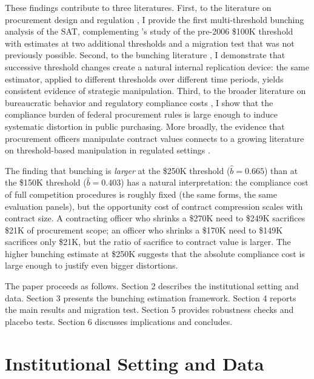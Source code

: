 \documentclass[12pt]{article}
\begin{document}
These findings contribute to three literatures. First, to the literature on procurement design and regulation \citep{bandiera2009, bosio2022, carril2022}, I provide the first multi-threshold bunching analysis of the SAT, complementing \citet{carril2022}'s study of the pre-2006 \$100K threshold with estimates at two additional thresholds and a migration test that was not previously possible. Second, to the bunching literature \citep{kleven2016}, I demonstrate that successive threshold changes create a natural internal replication device: the same estimator, applied to different thresholds over different time periods, yields consistent evidence of strategic manipulation. Third, to the broader literature on bureaucratic behavior and regulatory compliance costs \citep{finan2017, deserranno2019, best2023}, I show that the compliance burden of federal procurement rules is large enough to induce systematic distortion in public purchasing. More broadly, the evidence that procurement officers manipulate contract values connects to a growing literature on threshold-based manipulation in regulated settings \citep{kang2023}.

The finding that bunching is \textit{larger} at the \$250K threshold ($\hat{b} = 0.665$) than at the \$150K threshold ($\hat{b} = 0.403$) has a natural interpretation: the compliance cost of full competition procedures is roughly fixed (the same forms, the same evaluation panels), but the opportunity cost of contract compression scales with contract size. A contracting officer who shrinks a \$270K need to \$249K sacrifices \$21K of procurement scope; an officer who shrinks a \$170K need to \$149K sacrifices only \$21K, but the ratio of sacrifice to contract value is larger. The higher bunching estimate at \$250K suggests that the absolute compliance cost is large enough to justify even bigger distortions.

The paper proceeds as follows. Section 2 describes the institutional setting and data. Section 3 presents the bunching estimation framework. Section 4 reports the main results and migration test. Section 5 provides robustness checks and placebo tests. Section 6 discusses implications and concludes.

\section{Institutional Setting and Data}
\end{document}
